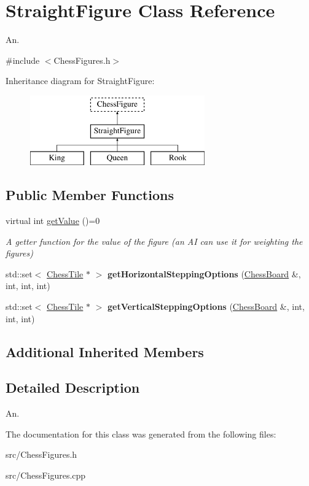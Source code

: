 \hypertarget{classStraightFigure}{}\section{Straight\+Figure Class Reference}
\label{classStraightFigure}


An.  




{\ttfamily \#include $<$Chess\+Figures.\+h$>$}

Inheritance diagram for Straight\+Figure\+:\begin{figure}[H]
\begin{center}
\leavevmode
\includegraphics[height=3.000000cm]{classStraightFigure}
\end{center}
\end{figure}
\subsection*{Public Member Functions}
\begin{DoxyCompactItemize}
\item 
\mbox{\label{classStraightFigure_a09d46ae2b3f043b9ac3e05ed6d95d420}} 
virtual int \mbox{\hyperlink{classStraightFigure_a09d46ae2b3f043b9ac3e05ed6d95d420}{get\+Value}} ()=0
\begin{DoxyCompactList}\small\item\em A getter function for the value of the figure (an AI can use it for weighting the figures) \end{DoxyCompactList}\item 
\mbox{\label{classStraightFigure_ac466b7394b41a10c582c9f363e907494}} 
std\+::set$<$ \mbox{\hyperlink{classChessTile}{Chess\+Tile}} $\ast$ $>$ {\bfseries get\+Horizontal\+Stepping\+Options} (\mbox{\hyperlink{classChessBoard}{Chess\+Board}} \&, int, int, int)
\item 
\mbox{\label{classStraightFigure_a9d0fd89679a129342adef0fd64c31dfa}} 
std\+::set$<$ \mbox{\hyperlink{classChessTile}{Chess\+Tile}} $\ast$ $>$ {\bfseries get\+Vertical\+Stepping\+Options} (\mbox{\hyperlink{classChessBoard}{Chess\+Board}} \&, int, int, int)
\end{DoxyCompactItemize}
\subsection*{Additional Inherited Members}


\subsection{Detailed Description}
An. 

The documentation for this class was generated from the following files\+:\begin{DoxyCompactItemize}
\item 
src/Chess\+Figures.\+h\item 
src/Chess\+Figures.\+cpp\end{DoxyCompactItemize}
